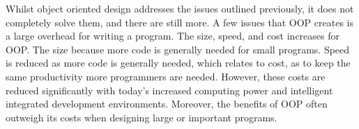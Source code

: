 \documentclass[11pt]{article} %
\begin{document}
Whilst object oriented design addresses the issues outlined previously, it does not completely solve them, and there are still more. A few issues that OOP creates is a large overhead for writing a program. The size, speed, and cost increases for OOP\cite{cs164:2}. The size because more code is generally needed for small programs. Speed is reduced as more code is generally needed, which relates to cost, as to keep the same productivity more programmers are needed. However, these costs are reduced significantly with today's increased computing power and intelligent integrated development environments. Moreover, the benefits of OOP often outweigh its costs when designing large or important programs.




\end{document}
